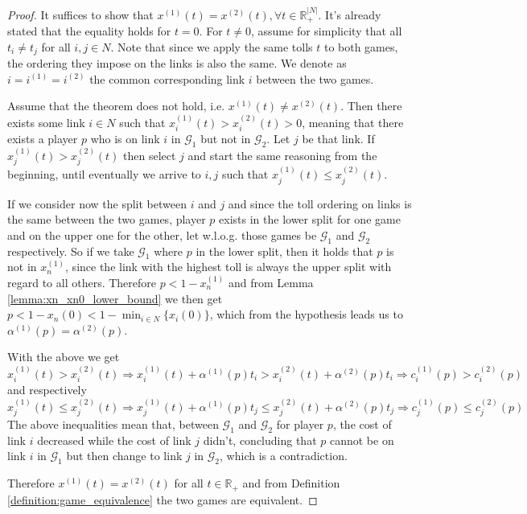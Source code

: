 \documentclass[10pt,a4paper]{book}
\newcommand{\R}{\mathbb{R}}
\newcommand{\Gm}{\mathcal{G}}
\theoremstyle{definition}
\theoremstyle{comment}
\begin{document}
\begin{proof}
	It suffices to show that $x^{(1)}(t) = x^{(2)}(t), \forall t \in \R_+^{|N|}$.
	It's already stated that the equality holds for $t = 0$.
	For $t \ne 0$, assume for simplicity that all $t_i \ne t_j$ for all $i, j \in N$.
	Note that since we apply the same tolls $t$ to both games, the ordering they impose on the links is also the same.
	We denote as $i = i^{(1)} = i^{(2)}$ the common corresponding link $i$ between the two games.

	Assume that the theorem does not hold, i.e. $x^{(1)}(t) \ne x^{(2)}(t)$.
	Then there exists some link $i \in N$ such that $x_i^{(1)}(t) > x_i^{(2)}(t) > 0$, meaning that there exists a player $p$ who is on link $i$ in $\Gm_1$ but not in $\Gm_2$.
	Let $j$ be that link.
	If $x_j^{(1)}(t) > x_j^{(2)}(t)$ then select $j$ and start the same reasoning from the beginning, until eventually we arrive to $i, j$ such that $x_j^{(1)}(t) \le x_j^{(2)}(t)$.

	If we consider now the split between $i$ and $j$ and since the toll ordering on links is the same between the two games, player $p$ exists in the lower split for one game and on the upper one for the other, let w.l.o.g. those games be $\Gm_1$ and $\Gm_2$ respectively.
	So if we take $\Gm_1$ where $p$ in the lower split, then it holds that $p$ is not in $x_n^{(1)}$, since the link with the highest toll is always the upper split with regard to all others.
	Therefore $p < 1 - x_n^{(1)}$ and from Lemma \ref{lemma:xn_xn0_lower_bound} we then get $p < 1 - x_n(0) < 1 - \min_{i \in N}\{x_i(0)\}$, which from the hypothesis leads us to $\alpha^{(1)}(p) = \alpha^{(2)}(p)$.

	With the above we get
	\[x_i^{(1)}(t) > x_i^{(2)}(t) \Rightarrow x_i^{(1)}(t) + \alpha^{(1)}(p)t_i > x_i^{(2)}(t) + \alpha^{(2)}(p)t_i \Rightarrow c_i^{(1)}(p) > c_i^{(2)}(p)\]
	and respectively
	\[x_j^{(1)}(t) \le x_j^{(2)}(t) \Rightarrow x_j^{(1)}(t) + \alpha^{(1)}(p)t_j \le x_j^{(2)}(t) + \alpha^{(2)}(p)t_j \Rightarrow c_j^{(1)}(p) \le c_j^{(2)}(p)\]
	The above inequalities mean that, between $\Gm_1$ and $\Gm_2$ for player $p$, the cost of link $i$ decreased while the cost of link $j$ didn't, concluding that $p$ cannot be on link $i$ in $\Gm_1$ but then change to link $j$ in $\Gm_2$, which is a contradiction.

	Therefore $x^{(1)}(t) = x^{(2)}(t)$ for all $t \in \R_+$ and from Definition \ref{definition:game_equivalence} the two games are equivalent.
\end{proof}
\end{document}
